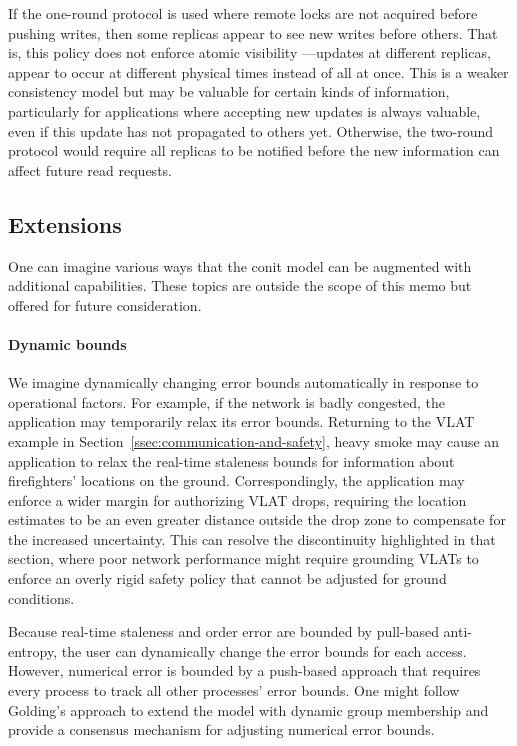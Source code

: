 \documentclass[]             %
{NASA}                       %
\theoremstyle{definition}
\begin{document}
If the one-round protocol is used where remote locks are not acquired
before pushing writes, then some replicas appear to see new writes
before others. That is, this policy does not enforce atomic visibility
---updates at different replicas, appear to occur at different
physical times instead of all at once. This is a weaker consistency
model but may be valuable for certain kinds of information,
particularly for applications where accepting new updates is
always valuable, even if this update has not propagated to others
yet. Otherwise, the two-round protocol would require all replicas to
be notified before the new information can affect future read
requests.

\subsection{Extensions}
\label{ssec:conit-extensions}
One can imagine various ways that the conit model can be augmented
with additional capabilities. These topics are outside the scope of
this memo but offered for future consideration.

\paragraph{Dynamic bounds}
We imagine dynamically changing error bounds automatically in response
to operational factors. For example, if the network is badly
congested, the application may temporarily relax its error
bounds. Returning to the VLAT example in
Section~\ref{ssec:communication-and-safety}, heavy smoke may cause an
application to relax the real-time staleness bounds for information
about firefighters' locations on the ground. Correspondingly, the
application may enforce a wider margin for authorizing VLAT drops,
requiring the location estimates to be an even greater distance
outside the drop zone to compensate for the increased
uncertainty. This can resolve the discontinuity highlighted in that
section, where poor network performance might require grounding VLATs
to enforce an overly rigid safety policy that cannot be adjusted for
ground conditions.

Because real-time staleness and order error are bounded by pull-based
anti-entropy, the user can dynamically change the error bounds for
each access. However, numerical error is bounded by a push-based
approach that requires every process to track all other processes'
error bounds. One might follow Golding's approach
\cite{1992:golding-thesis} to extend the model with dynamic group
membership and provide a consensus mechanism for adjusting numerical
error bounds.
\end{document}

